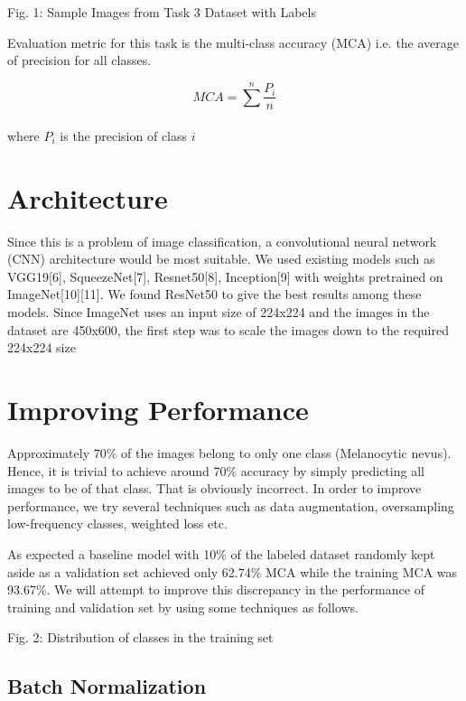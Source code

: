 \documentclass[conference]{IEEEtran}
\begin{document}
    Fig. 1: Sample Images from Task 3 Dataset with Labels 

    Evaluation metric for this task is the multi-class accuracy (MCA) i.e.
the average of precision for all classes.

\begin{equation}
MCA = \sum_{}^{n}\frac{P_i}{n}
\end{equation}

where $P_i$ is the precision of class $i$

    \section{Architecture}\label{architecture}

Since this is a problem of image classification, a convolutional neural
network (CNN) architecture would be most suitable. We used existing
models such as VGG19{[}6{]}, SqueezeNet{[}7{]}, Resnet50{[}8{]},
Inception{[}9{]} with weights pretrained on ImageNet{[}10{]}{[}11{]}. We
found ResNet50 to give the best results among these models.
Since ImageNet uses an input size of 224x224 and the images in the
dataset are 450x600, the first step was to scale the images down to the
required 224x224 size

    \section{Improving Performance}\label{improving-performance}

Approximately 70\% of the images belong to only one class (Melanocytic
nevus). Hence, it is trivial to achieve around 70\% accuracy by simply
predicting all images to be of that class. That is obviously incorrect.
In order to improve performance, we try several techniques such as data
augmentation, oversampling low-frequency classes, weighted loss etc.

As expected a baseline model with 10\% of the labeled dataset randomly
kept aside as a validation set achieved only 62.74\% MCA while the
training MCA was 93.67\%. We will attempt to improve this discrepancy in
the performance of training and validation set by using some techniques
as follows.

Fig. 2: Distribution of classes in the training set 

    \subsection{Batch Normalization}\label{batch-normalization}
\end{document}
